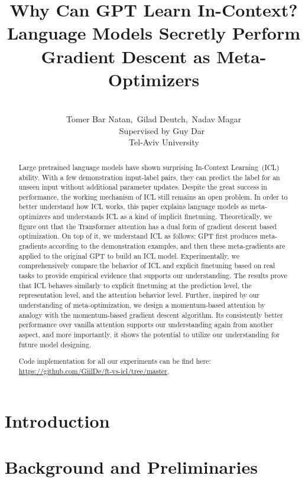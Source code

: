 \documentclass[11pt]{article}
\title{Why Can GPT Learn In-Context? \\ Language Models Secretly Perform Gradient Descent as Meta-Optimizers}
\author{\\
Tomer Bar Natan,~Gilad Deutch,~Nadav Magar\\
~~~~Supervised by Guy Dar\\
~~~~~Tel-Aviv University}
\date{}
\begin{document}
\maketitle

\begin{abstract}

	Large pretrained language models have shown surprising In-Context Learning~(ICL) ability.
	With a few demonstration input-label pairs, they can predict the label for an unseen input without additional parameter updates.
	Despite the great success in performance, the working mechanism of ICL still remains an open problem.
	In order to better understand how ICL works, this paper explains language models as meta-optimizers and understands ICL as a kind of implicit finetuning.
	Theoretically, we figure out that the Transformer attention has a dual form of gradient descent based optimization.
	On top of it, we understand ICL as follows: GPT first produces meta-gradients according to the demonstration examples, and then these meta-gradients are applied to the original GPT to build an ICL model.
	Experimentally, we comprehensively compare the behavior of ICL and explicit finetuning based on real tasks to provide empirical evidence that supports our understanding.
	The results prove that ICL behaves similarly to explicit finetuning at the prediction level, the representation level, and the attention behavior level.
	Further, inspired by our understanding of meta-optimization, we design a momentum-based attention by analogy with the momentum-based gradient descent algorithm.
	Its consistently better performance over vanilla attention supports our understanding again from another aspect, and more importantly, it shows the potential to utilize our understanding for future model designing.

Code implementation for all our experiments can be find here:
\href{https://github.com/GiilDe/ft-vs-icl/tree/master}{https://github.com/GiilDe/ft-vs-icl/tree/master}.
\end{abstract}

\section{Introduction}


\section{Background and Preliminaries}

\end{document}
